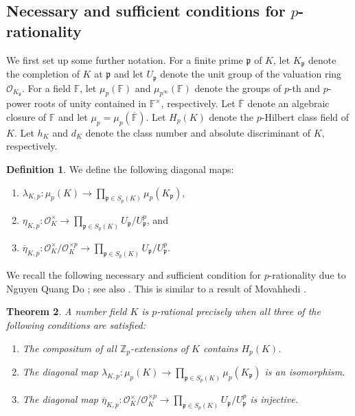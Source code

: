 \documentclass[12pt, a4paper, usenames]{amsart}
\newcommand{\Z}{\mathbb{Z}}
\theoremstyle{plain}
\newtheorem{theorem}{Theorem}[section]
\theoremstyle{remark}
\theoremstyle{definition}
\newtheorem{definition}[theorem]{Definition}
\begin{document}
\subsection{Necessary and sufficient conditions for $p$-rationality}\label{subsec:nec-suff-p-rat}
We first set up some further notation.
For a finite prime $\mathfrak{p}$ of $K$, let $K_{\mathfrak{p}}$ denote the completion of 
$K$ at $\mathfrak{p}$ and 
let $U_{\mathfrak{p}}$ denote the unit group of the valuation ring
$\mathcal{O}_{K_{\mathfrak{p}}}$.
For a field $\mathbb{F}$, let $\mu_{p}(\mathbb{F})$ and $\mu_{p^\infty}(\mathbb{F})$
denote the groups of $p$-th and $p$-power roots of unity contained in $\mathbb{F}^{\times}$, respectively.
Let $\overline{\mathbb{F}}$ denote an algebraic closure of $\mathbb{F}$ and let 
$\mu_{p} = \mu_{p}(\overline{\mathbb{F}})$.
Let $H_{p}(K)$ denote the $p$-Hilbert class field of $K$.
Let $h_{K}$ and $d_{K}$ denote the class number and absolute discriminant of $K$, 
respectively. 

\begin{definition}\label{def:various-maps}
We define the following diagonal maps:
\begin{enumerate}
\item 
$\lambda_{K,p} : \mu_{p}(K) \longrightarrow \prod_{\mathfrak{p} \in S_{p}(K)} 
\mu_{p}(K_{\mathfrak{p}})$,
\item 
$\eta_{K,p} : \mathcal{O}_{K}^{\times} \longrightarrow 
\textstyle{\prod_{\mathfrak{p} \in S_{p}(K)}} U_{\mathfrak{p}}/ U_{\mathfrak{p}}^{p}$, and
\item
$\overline{\eta}_{K,p} : \mathcal{O}_{K}^{\times} / \mathcal{O}_{K}^{\times p } \longrightarrow 
\textstyle{\prod_{\mathfrak{p} \in S_{p}(K)}} U_{\mathfrak{p}}/ U_{\mathfrak{p}}^{p}$.
\end{enumerate}
\end{definition}

We recall the following necessary and sufficient condition for $p$-rationality due to 
Nguyen Quang Do \cite[Proposition~6.1]{do2025greenbergsgeneralizedconjecturefamilies};
see also \cite[Proposition~2.3]{MR4192837}.
This is similar to a result of Movahhedi \cite[Proposition~2]{MR1124802}.

\begin{theorem}\label{thm:nqd-char-p-rat}
A number field $K$ is $p$-rational precisely when all three of the following conditions are
satisfied:
\begin{enumerate}
    \item The compositum of all $\Z_{p}$-extensions of $K$ contains $H_{p}(K)$.
    \item The diagonal map $\lambda_{K,p} : \mu_{p}(K) \longrightarrow \prod_{\mathfrak{p} \in S_{p}(K)} 
    \mu_{p}(K_{\mathfrak{p}})$ is an isomorphism.
    \item The diagonal map 
    $\overline{\eta}_{K,p} : \mathcal{O}_{K}^{\times}/\mathcal{O}_{K}^{\times p} \longrightarrow 
    \prod_{\mathfrak{p} \in S_{p}(K)} U_{\mathfrak{p}}/ U_{\mathfrak{p}}^{p}$ is injective.
\end{enumerate}
\end{theorem}
\end{document}
